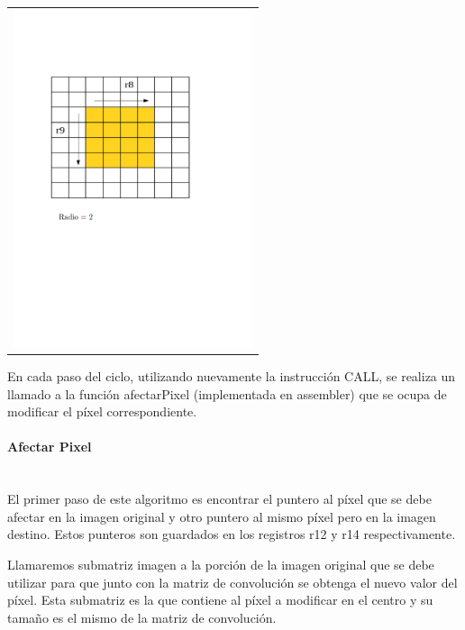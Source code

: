         {\centering \begin{tabular}{c}
          \includegraphics[width=7cm]{./imagenes/4bis.png} \\
        \end{tabular}}

      En cada paso del ciclo, utilizando nuevamente la instrucción CALL, se realiza un llamado a la función afectarPixel (implementada en assembler) que se ocupa de modificar el píxel correspondiente. 

      \paragraph{Afectar Pixel}\mbox{} \\
        El primer paso de este algoritmo es encontrar el puntero al píxel que se debe afectar en la imagen original y otro puntero al mismo píxel pero en la imagen destino. Estos punteros son guardados en los registros r12 y r14 respectivamente.   

        Llamaremos submatriz imagen a la porción de la imagen original que se debe utilizar para que junto con la matriz de convolución se obtenga el nuevo valor del píxel. Esta submatriz es la que contiene al píxel a modificar en el centro y su tamaño es el mismo de la matriz de convolución. 
        
